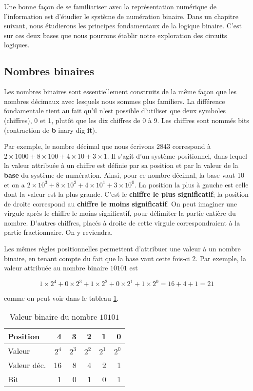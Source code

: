 \documentclass[11pt]{article}
\begin{document}
Une bonne façon de se familiariser avec la représentation numérique de
l'information est d'étudier le système de numération binaire. Dans un
chapitre suivant, nous étudierons les principes fondamentaux de la
logique binaire. C'est sur ces deux bases que nous pourrons établir
notre exploration des circuits logiques.

\subsection{Nombres binaires}
\label{sec:orgbe23087}

Les nombres binaires sont essentiellement construits de la même façon
que les nombres décimaux avec lesquels nous sommes plus familiers. La
différence fondamentale tient au fait qu'il n'est possible d'utiliser
que deux symboles (chiffres), 0 et 1, plutôt que les dix chiffres de 0
à 9. Les chiffres sont nommés bits (contraction de \textbf{b} inary dig
\textbf{it}).

Par exemple, le nombre décimal que nous écrivons \(2843\) correspond à
\(2 \times 1000 + 8 \times 100 + 4 \times 10 + 3 \times 1\). Il s'agit
d'un système positionnel, dans lequel la valeur attribuée à un chiffre
est définie par sa position et par la valeur de la \textbf{base} du système
de numération. Ainsi, pour ce nombre décimal, la base vaut 10 et on a
\(2 \times 10^3 + 8 \times 10^2 + 4 \times 10^1 + 3 \times 10^0\). La
position la plus à gauche est celle dont la valeur est la plus
grande. C'est le \textbf{chiffre le plus significatif}; la position de droite
correspond au \textbf{chiffre le moins significatif}. On peut imaginer une
virgule après le chiffre le moins significatif, pour délimiter la
partie entière du nombre. D'autres chiffres, placés à droite de cette
virgule correspondraient à la partie fractionnaire. On y reviendra.

Les mêmes règles positionnelles permettent d'attribuer une valeur à un
nombre binaire, en tenant compte du fait que la base vaut cette
fois-ci 2. Par exemple, la valeur attribuée au nombre binaire
\(10101\) est 

$$ 1 \times 2^4 + 0 \times 2^3 + 1 \times 2^2 + 0 \times 2^1 + 1
\times 2^0 = 16+4+1= 21 $$

comme on peut voir dans le tableau \ref{tab:org8d76df4}.

\begin{table}[htbp]
\caption{\label{tab:org8d76df4}Valeur binaire du nombre \(10101\)}
\centering
\begin{tabular}{lrrrrr}
Position & 4 & 3 & 2 & 1 & 0\\
\hline
Valeur & \(2^4\) & \(2^3\) & \(2^2\) & \(2^1\) & \(2^0\)\\
Valeur déc. & 16 & 8 & 4 & 2 & 1\\
Bit & 1 & 0 & 1 & 0 & 1\\
\end{tabular}
\end{table}
\end{document}
